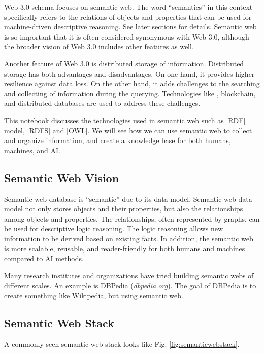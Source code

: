Web 3.0 schema focuses on semantic web. The word ``semantics'' in this context specifically refers to the relations of objects and properties that can be used for machine-driven descriptive reasoning. See later sections for details. Semantic web is so important that it is often considered synonymous with Web 3.0, although the broader vision of Web 3.0 includes other features as well.

Another feature of Web 3.0 is distributed storage of information. Distributed storage has both advantages and disadvantages. On one hand, it provides higher resilience against data loss. On the other hand, it adds challenges to the searching and collecting of information during the querying. Technologies like , blockchain, and distributed databases are used to address these challenges.

This notebook discusses the technologies used in semantic web such as [RDF] model, [RDFS] and [OWL]. We will see how we can use semantic web to collect and organize information, and create a knowledge base for both humans, machines, and AI.

\subsection{Semantic Web Vision}

Semantic web database is ``semantic'' due to its data model. Semantic web data model not only stores objects and their properties, but also the relationships among objects and properties. The relationships, often represented by graphs, can be used for descriptive logic reasoning. The logic reasoning allows new information to be derived based on existing facts. In addition, the semantic web is more scalable, reusable, and reader-friendly for both humans and machines compared to AI methods.

Many research institutes and organizations have tried building semantic webs of different scales. An example is DBPedia (\textit{dbpedia.org}). The goal of DBPedia is to create something like Wikipedia, but using semantic web.

\subsection{Semantic Web Stack} \label{subsec:semanticwebstack}

A commonly seen semantic web stack looks like Fig. \ref{fig:semanticwebstack}. 

